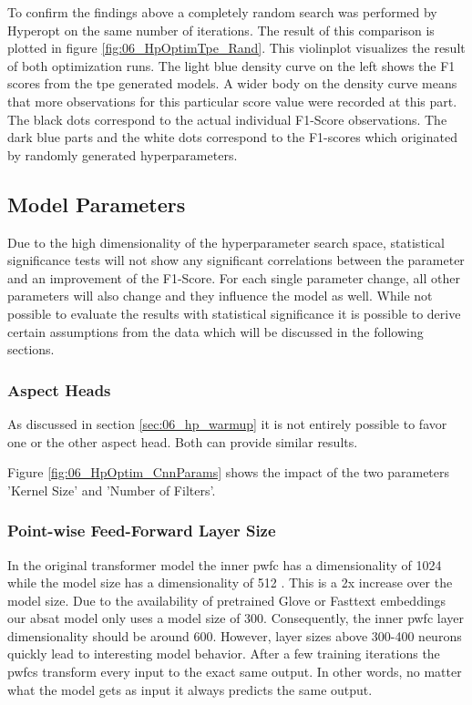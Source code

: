 To confirm the findings above a completely random search was performed by Hyperopt on the same number of iterations. The result of this comparison is plotted in figure \ref{fig:06_HpOptimTpe_Rand}. This violinplot visualizes the result of both optimization runs. The light blue density curve on the left shows the F1 scores from the \gls{tpe} generated models. A wider body on the density curve means that more observations for this particular score value were recorded at this part. The black dots correspond to the actual individual F1-Score observations. The dark blue parts and the white dots correspond to the F1-scores which originated by randomly generated hyperparameters.

\subsection{Model Parameters}

Due to the high dimensionality of the hyperparameter search space, statistical significance tests will not show any significant correlations between the parameter and an improvement of the F1-Score. For each single parameter change, all other parameters will also change and they influence the model as well. While not possible to evaluate the results with statistical significance it is possible to derive certain assumptions from the data which will be discussed in the following sections.

\subsubsection{Aspect Heads}

As discussed in section \ref{sec:06_hp_warmup} it is not entirely possible to favor one or the other aspect head. Both can provide similar results. 


Figure \ref{fig:06_HpOptim_CnnParams} shows the impact of the two parameters 'Kernel Size' and 'Number of Filters'.

\subsubsection{Point-wise Feed-Forward Layer Size}

In the original transformer model the inner \acrfull{pwfc} has a dimensionality of 1024 while the model size has a dimensionality of 512 \cite{Vaswani2017c}. This is a 2x increase over the model size. Due to the availability of pretrained Glove or Fasttext embeddings our \gls{absat} model only uses a model size of 300. Consequently, the inner \gls{pwfc} layer dimensionality should be around 600. However, layer sizes above 300-400 neurons quickly lead to interesting model behavior. After a few training iterations the \glspl{pwfc} transform every input to the exact same output. In other words, no matter what the model gets as input it always predicts the same output.
\medskip

